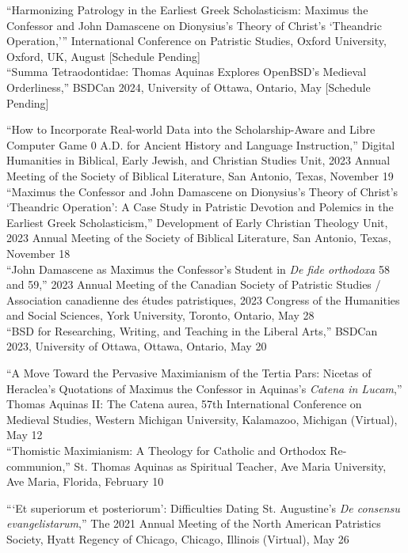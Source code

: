 \documentclass[letterpaper,12pt]{article}
\newcommand{\years}[1]{%
  {\reversemarginpar\strut\marginnote{{\small#1}}}%
}
\begin{document}
{{{{{{{\years{2024}%
%
``Harmonizing Patrology in the Earliest Greek Scholasticism: Maximus the Confessor and John Damascene on Dionysius's Theory of Christ's `Theandric Operation,''' International Conference on Patristic Studies, Oxford University, Oxford, UK, August [Schedule Pending] \\ [.3cm]
%
``Summa Tetraodontidae: Thomas Aquinas Explores OpenBSD's Medieval Orderliness,'' BSDCan 2024, University of Ottawa, Ontario, May [Schedule Pending] \\ [.3cm]
%
\years{2023}%
%
``How to Incorporate Real-world Data into the Scholarship-Aware and Libre Computer Game 0 A.D. for Ancient History and Language Instruction,'' Digital Humanities in Biblical, Early Jewish, and Christian Studies Unit, 2023 Annual Meeting of the Society of Biblical Literature, San Antonio, Texas, November 19  \\ [.3cm]
%
``Maximus the Confessor and John Damascene on Dionysius's Theory of Christ's `Theandric Operation': A Case Study in Patristic Devotion and Polemics in the Earliest Greek Scholasticism,'' Development of Early Christian Theology Unit, 2023 Annual Meeting of the Society of Biblical Literature, San Antonio, Texas, November 18  \\ [.3cm]
%
``John Damascene as Maximus the Confessor's Student in \emph{De fide orthodoxa} 58 and 59,'' 2023 Annual Meeting of the Canadian Society of Patristic Studies / Association canadienne des études patristiques, 2023 Congress of the Humanities and Social Sciences, York University, Toronto, Ontario, May 28  \\ [.3cm]
%
``BSD for Researching, Writing, and Teaching in the Liberal Arts,'' BSDCan 2023, University of Ottawa, Ottawa, Ontario, May 20  \\ [.3cm]
%
\years{2022}%
%
``A Move Toward the Pervasive Maximianism of the Tertia Pars: Nicetas of Heraclea's Quotations of Maximus the Confessor in Aquinas's \emph{Catena in Lucam},'' Thomas Aquinas II: The Catena aurea, 57th International Conference on Medieval Studies, Western Michigan University, Kalamazoo, Michigan (Virtual), May 12 \\ [.3cm]
%
``Thomistic Maximianism: A Theology for Catholic and Orthodox Re-communion,'' St. Thomas Aquinas as Spiritual Teacher, Ave Maria University, Ave Maria, Florida, February 10 \\ [.3cm]
%
\years{2021}%
%
```Et superiorum et posteriorum': Difficulties Dating St. Augustine's \emph{De consensu evangelistarum},'' The 2021 Annual Meeting of the North American Patristics Society, Hyatt Regency of Chicago, Chicago, Illinois (Virtual), May 26 \\ [.3cm]
}}}}}}}
\end{document}
